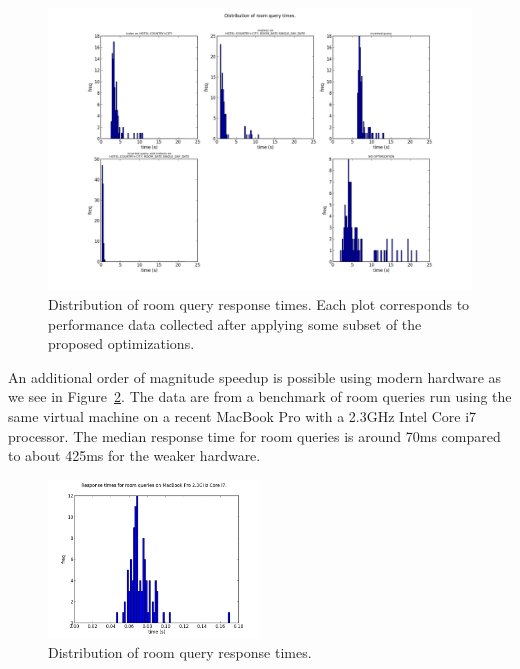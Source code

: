\documentclass[letterpaper]{article}%
\begin{document}
\begin{figure}[ht]
  \centering
  \includegraphics[width=\textwidth]{../ReserveWithUsApp/benchmark_data/1.png}
  \caption{Distribution of room query response times. Each plot corresponds to
    performance data collected after applying some subset of the proposed
    optimizations.}
  \label{fig:roomqueries}
\end{figure}

An additional order of magnitude speedup is possible using modern hardware as
we see in Figure~\ref{fig:roomqueriesmbp}. The data are from a benchmark of
room queries run using the same virtual machine on a recent MacBook Pro with a
2.3GHz Intel Core i7 processor. The median response time for room queries is
around 70ms compared to about 425ms for the weaker hardware.

\begin{figure}[ht]
  \centering
  \includegraphics[width=0.5\textwidth]{../ReserveWithUsApp/benchmark_data/room_times_mbp.png}
  \caption{Distribution of room query response times.}
  \label{fig:roomqueriesmbp}
\end{figure}
\end{document}
